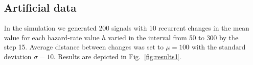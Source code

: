 \subsection{Artificial data}
In the simulation we generated 200 signals with 10 recurrent changes in the mean value for each hazard-rate value $h$ varied in the interval from 50 to 300 by the step 15.
Average distance between changes was set to $\mu = 100$ with the standard deviation $\sigma = 10$.
%
Results are depicted in Fig.~\ref{fig:results1}.
%
\begin{figure}[!htb]
    \begin{minipage}{0.5\textwidth}
        \centering
        \fbox{\includegraphics[
}
\end{minipage}
\end{figure}
